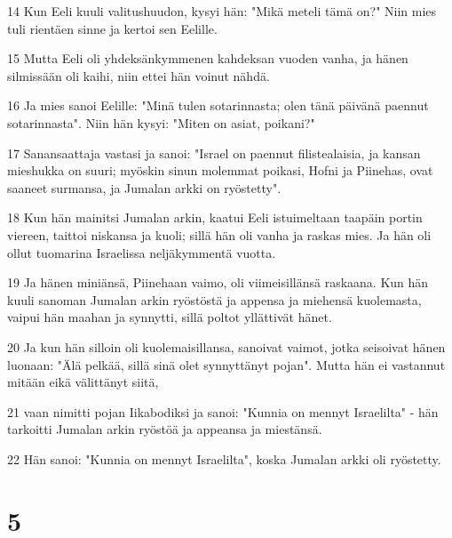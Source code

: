 \par 14 Kun Eeli kuuli valitushuudon, kysyi hän: "Mikä meteli tämä on?" Niin mies tuli rientäen sinne ja kertoi sen Eelille.
\par 15 Mutta Eeli oli yhdeksänkymmenen kahdeksan vuoden vanha, ja hänen silmissään oli kaihi, niin ettei hän voinut nähdä.
\par 16 Ja mies sanoi Eelille: "Minä tulen sotarinnasta; olen tänä päivänä paennut sotarinnasta". Niin hän kysyi: "Miten on asiat, poikani?"
\par 17 Sanansaattaja vastasi ja sanoi: "Israel on paennut filistealaisia, ja kansan mieshukka on suuri; myöskin sinun molemmat poikasi, Hofni ja Piinehas, ovat saaneet surmansa, ja Jumalan arkki on ryöstetty".
\par 18 Kun hän mainitsi Jumalan arkin, kaatui Eeli istuimeltaan taapäin portin viereen, taittoi niskansa ja kuoli; sillä hän oli vanha ja raskas mies. Ja hän oli ollut tuomarina Israelissa neljäkymmentä vuotta.
\par 19 Ja hänen miniänsä, Piinehaan vaimo, oli viimeisillänsä raskaana. Kun hän kuuli sanoman Jumalan arkin ryöstöstä ja appensa ja miehensä kuolemasta, vaipui hän maahan ja synnytti, sillä poltot yllättivät hänet.
\par 20 Ja kun hän silloin oli kuolemaisillansa, sanoivat vaimot, jotka seisoivat hänen luonaan: "Älä pelkää, sillä sinä olet synnyttänyt pojan". Mutta hän ei vastannut mitään eikä välittänyt siitä,
\par 21 vaan nimitti pojan Iikabodiksi ja sanoi: "Kunnia on mennyt Israelilta" - hän tarkoitti Jumalan arkin ryöstöä ja appeansa ja miestänsä.
\par 22 Hän sanoi: "Kunnia on mennyt Israelilta", koska Jumalan arkki oli ryöstetty.

\chapter{5}

